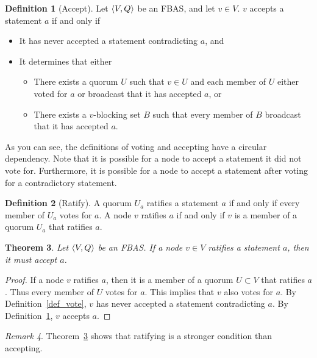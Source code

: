 \documentclass[12pt, psamsfonts]{amsart}
\newtheorem{thm}{Theorem}[subsection]
\theoremstyle{definition}
\newtheorem{defn}[thm]{Definition}
\theoremstyle{remark}
\newtheorem{rem}[thm]{Remark}
\numberwithin{equation}{subsection}
\begin{document}
\begin{defn}[Accept]\label{def_accept}
    Let $\ev{V, Q}$ be an FBAS\@, and let $v \in V$.
    $v$ accepts a statement $a$ if and only if 
    \begin{itemize}
        \item
            It has never accepted a statement contradicting $a$, and
        \item
            It determines that either
            \begin{itemize}
                \item
                    There exists a quorum $U$ such that $v \in U$ and each member of $U$ either voted for $a$ or broadcast that it has accepted $a$, or
                \item
                    There exists a $v$-blocking set $B$ such that every member of $B$ broadcast that it has accepted $a$.
            \end{itemize}
    \end{itemize}
\end{defn}

As you can see, the definitions of voting and accepting have a circular dependency.
Note that it is possible for a node to accept a statement it did not vote for.
Furthermore, it is possible for a node to accept a statement after voting for a contradictory statement.

\begin{defn}[Ratify]\label{def_ratify}
    A quorum $U_a$ ratifies a statement $a$ if and only if every member of $U_a$ votes for $a$.
    A node $v$ ratifies $a$ if and only if $v$ is a member of a quorum $U_a$ that ratifies $a$.
\end{defn}

\begin{thm}\label{ratify_implies_accept}
    Let $\ev{V, Q}$ be an FBAS\@.
    If a node $v \in V$ ratifies a statement $a$, then it must accept $a$.
\end{thm}

\begin{proof}
    If a node $v$ ratifies $a$, then it is a member of a quorum $U \subset V$ that ratifies $a$.
    Thus every member of $U$ votes for $a$.
    This implies that $v$ also votes for $a$.
    By Definition~\ref{def_vote}, $v$ has never accepted a statement contradicting $a$.
    By Definition~\ref{def_accept}, $v$ accepts $a$.
\end{proof}

\begin{rem}
    Theorem~\ref{ratify_implies_accept} shows that ratifying is a stronger condition than accepting.
\end{rem}
\end{document}
